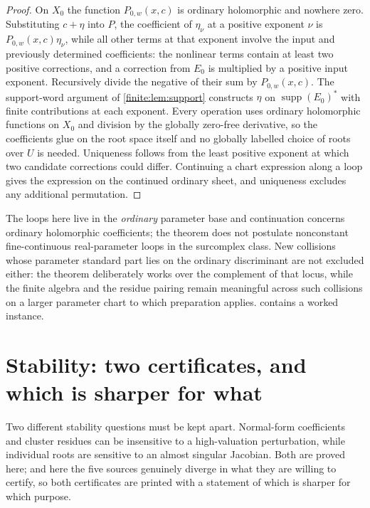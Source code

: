 \documentclass[11pt,letterpaper]{article}
\theoremstyle{definition}
\theoremstyle{remark}
\DeclareMathOperator{\supp}{supp}
\numberwithin{equation}{section}
\begin{document}
\begin{proof}
On $X_0$ the function $P_{0,w}(x,c)$ is ordinary holomorphic and nowhere zero. Substituting $c+\eta$ into $P$, the coefficient of $\eta_\nu$ at a positive exponent $\nu$ is $P_{0,w}(x,c)\eta_\nu$, while all other terms at that exponent involve the input and previously determined coefficients: the nonlinear terms contain at least two positive corrections, and a correction from $E_0$ is multiplied by a positive input exponent. Recursively divide the negative of their sum by $P_{0,w}(x,c)$. The support-word argument of \cref{finite:lem:support} constructs $\eta$ on $\supp(E_0)^*$ with finite contributions at each exponent. Every operation uses ordinary holomorphic functions on $X_0$ and division by the globally zero-free derivative, so the coefficients glue on the root space itself and no globally labelled choice of roots over $U$ is needed. Uniqueness follows from the least positive exponent at which two candidate corrections could differ. Continuing a chart expression along a loop gives the expression on the continued ordinary sheet, and uniqueness excludes any additional permutation.
\end{proof}

The loops here live in the \emph{ordinary} parameter base and continuation concerns ordinary holomorphic coefficients; the theorem does not postulate nonconstant fine-continuous real-parameter loops in the surcomplex class. New collisions whose parameter standard part lies on the ordinary discriminant are not excluded either: the theorem deliberately works over the complement of that locus, while the finite algebra and the residue pairing remain meaningful across such collisions on a larger parameter chart to which preparation applies.  contains a worked instance.

\section{Stability: two certificates, and which is sharper for what}
\label{finite:sec:stability}

Two different stability questions must be kept apart. Normal-form coefficients and cluster residues can be insensitive to a high-valuation perturbation, while individual roots are sensitive to an almost singular Jacobian. Both are proved here; and here the five sources genuinely diverge in what they are willing to certify, so both certificates are printed with a statement of which is sharper for which purpose.
\end{document}
